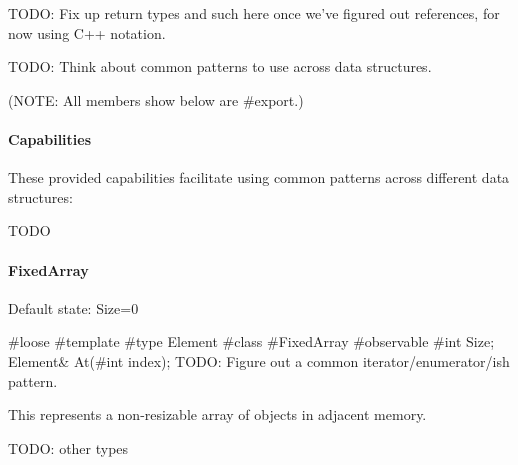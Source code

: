 \documentclass{article}
\newenvironment{codebox} {\snugshade\verbatim} {\endverbatim\endsnugshade}
\newcommand{\breakingparagraph}[1]{\paragraph{#1}\mbox{}\medbreak}
\begin{document}
TODO: Fix up return types and such here once we've figured out references, for now using C++ notation.

TODO: Think about common patterns to use across data structures.

(NOTE: All members show below are \#export.)

\breakingparagraph{Capabilities}

These provided capabilities facilitate using common patterns across different data structures:

TODO

\breakingparagraph{FixedArray}

Default state: Size=0

\begin{codebox}
#loose #template
#type Element
#class #FixedArray
{
    #observable #int Size;
    Element& At(#int index);
}
\end{codebox}
TODO: Figure out a common iterator/enumerator/ish pattern.

This represents a non-resizable array of objects in adjacent memory.

TODO: other types
\end{document}
